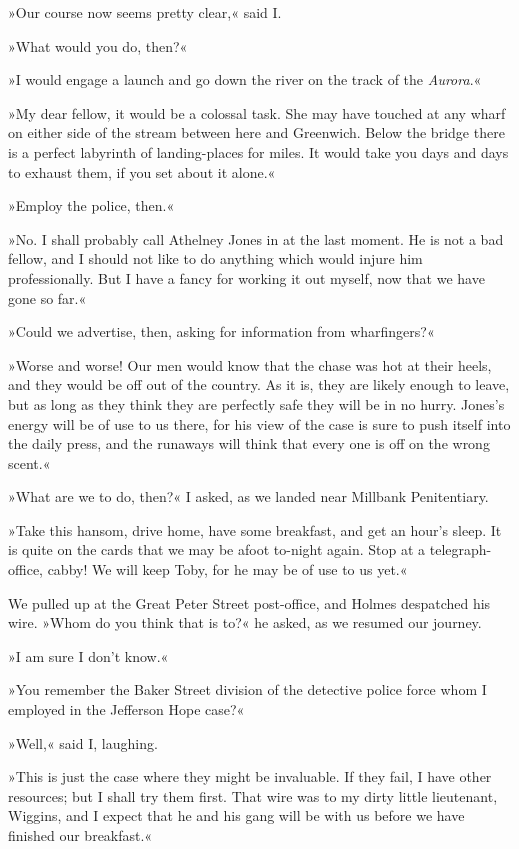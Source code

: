 »Our course now seems pretty clear,« said I.

»What would you do, then?«

»I would engage a launch and go down the river on the track of the \textit{Aurora}.«

»My dear fellow, it would be a colossal task. She may have touched at any wharf on either side of the stream between here and Greenwich. Below the bridge there is a perfect labyrinth of landing-places for miles. It would take you days and days to exhaust them, if you set about it alone.«

»Employ the police, then.«

»No. I shall probably call Athelney Jones in at the last moment. He is not a bad fellow, and I should not like to do anything which would injure him professionally. But I have a fancy for working it out myself, now that we have gone so far.«

»Could we advertise, then, asking for information from wharfingers?«

»Worse and worse! Our men would know that the chase was hot at their heels, and they would be off out of the country. As it is, they are likely enough to leave, but as long as they think they are perfectly safe they will be in no hurry. Jones's energy will be of use to us there, for his view of the case is sure to push itself into the daily press, and the runaways will think that every one is off on the wrong scent.«

»What are we to do, then?« I asked, as we landed near Millbank Penitentiary.

»Take this hansom, drive home, have some breakfast, and get an hour's sleep. It is quite on the cards that we may be afoot to-night again. Stop at a telegraph-office, cabby! We will keep Toby, for he may be of use to us yet.«

We pulled up at the Great Peter Street post-office, and Holmes despatched his wire. »Whom do you think that is to?« he asked, as we resumed our journey.

»I am sure I don't know.«

»You remember the Baker Street division of the detective police force whom I employed in the Jefferson Hope case?«

»Well,« said I, laughing.

»This is just the case where they might be invaluable. If they fail, I have other resources; but I shall try them first. That wire was to my dirty little lieutenant, Wiggins, and I expect that he and his gang will be with us before we have finished our breakfast.«

